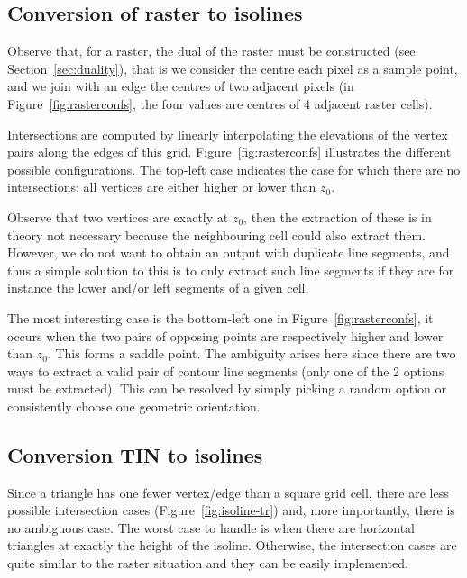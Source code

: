 \subsection{Conversion of raster to isolines}%
\label{sec:r-iso}


Observe that, for a raster, the dual of the raster must be constructed (see Section~\ref{sec:duality}), that is we consider the centre each pixel as a sample point, and we join with an edge the centres of two adjacent pixels (in Figure~\ref{fig:rasterconfs}, the four values are centres of 4 adjacent raster cells).

Intersections are computed by linearly interpolating the elevations of the vertex pairs along the edges of this grid.
Figure~\ref{fig:rasterconfs} illustrates the different possible configurations. 
The top-left case indicates the case for which there are no intersections: all vertices are either higher or lower than $z_0$. 

Observe that two vertices are exactly at $z_0$, then the extraction of these is in theory not necessary because the neighbouring cell could also extract them. 
However, we do not want to obtain an output with duplicate line segments, and thus a simple solution to this is to only extract such line segments if they are for instance the lower and/or left segments of a given cell.

The most interesting case is the bottom-left one in Figure~\ref{fig:rasterconfs}, it occurs when the two pairs of opposing points are respectively higher and lower than $z_0$.
This forms a saddle point. 
The ambiguity arises here since there are two ways to extract a valid pair of contour line segments (only one of the 2 options must be extracted).
This can be resolved by simply picking a random option or consistently choose one geometric orientation. 


\subsection{Conversion TIN to isolines}%
\label{sec:tin-iso}

Since a triangle has one fewer vertex/edge than a square grid cell, there are less possible intersection cases (Figure~\ref{fig:isoline-tr}) and, more importantly, there is no ambiguous case. 
The worst case to handle is when there are horizontal triangles at exactly the height of the isoline.
Otherwise, the intersection cases are quite similar to the raster situation and they can be easily implemented.

